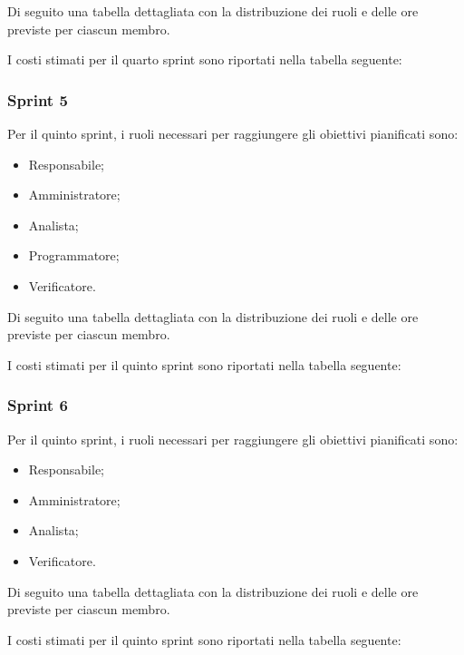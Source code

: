 \newpage
Di seguito una tabella dettagliata con la distribuzione dei ruoli e delle ore previste per ciascun membro.



I costi stimati per il quarto sprint sono riportati nella tabella seguente:



\subsubsection{Sprint 5}
Per il quinto sprint, i ruoli necessari per raggiungere gli obiettivi pianificati sono:
\begin{itemize}
    \item Responsabile;
    \item Amministratore;
    \item Analista;
    \item Programmatore;
    \item Verificatore.
\end{itemize}

\newpage
Di seguito una tabella dettagliata con la distribuzione dei ruoli e delle ore previste per ciascun membro.



I costi stimati per il quinto sprint sono riportati nella tabella seguente:



\subsubsection{Sprint 6}
Per il quinto sprint, i ruoli necessari per raggiungere gli obiettivi pianificati sono:
\begin{itemize}
    \item Responsabile;
    \item Amministratore;
    \item Analista;
    \item Verificatore.
\end{itemize}

\newpage
Di seguito una tabella dettagliata con la distribuzione dei ruoli e delle ore previste per ciascun membro.



I costi stimati per il quinto sprint sono riportati nella tabella seguente:

